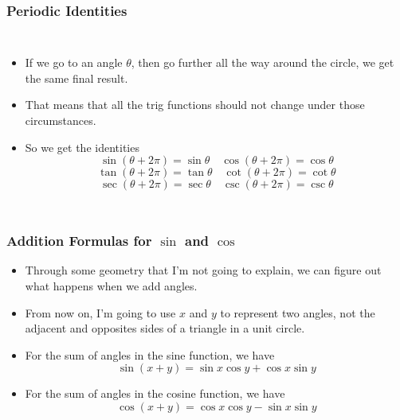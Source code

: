 \documentclass[serif,ignorenonframetext]{beamer}
\begin{document}
\begin{frame}
  \frametitle{Periodic Identities}
  \begin{columns}
  \begin{itemize}[<+->]
  \item If we go to an angle $\theta$, then go further all the way
    around the circle, we get the same final result.
  \item That means that all the trig functions should not change under
    those circumstances.
  \item So we get the identities 
    \begin{equation*}
      \sin(\theta+2\pi)=\sin\theta \quad
      \cos(\theta+2\pi)=\cos\theta 
    \end{equation*}
    \begin{equation*}
      \tan(\theta+2\pi)=\tan\theta \quad
      \cot(\theta+2\pi)=\cot\theta
    \end{equation*}
    \begin{equation*}
      \sec(\theta+2\pi)=\sec\theta \quad
      \csc(\theta+2\pi)=\csc\theta 
    \end{equation*}
  \end{itemize}
  \end{columns}
\end{frame}

\begin{frame}
  \frametitle{Addition Formulas for $\sin$ and $\cos$}
  \begin{itemize}[<+->]
  \item Through some geometry that I'm not going to explain, we can
    figure out what happens when we add angles.
  \item From now on, I'm going to use $x$ and $y$ to represent two
    angles, not the adjacent and opposites sides of a triangle in a
    unit circle.
  \item For the sum of angles in the sine function, we have
    \begin{equation*}
      \sin(x+y) = \sin x \cos y + \cos x \sin y
    \end{equation*}
  \item For the sum of angles in the cosine function, we have
    \begin{equation*}
      \cos(x+y) = \cos x \cos y - \sin x \sin y
    \end{equation*}
  \end{itemize}
\end{frame}
\end{document}
